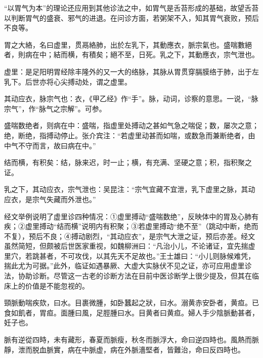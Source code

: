 \documentclass[12pt]{ctexbook}
\begin{document}
“以胃气为本”的理论还应用到其他诊法之中，如胃气是舌苔形成的基础，故望舌苔以判断胃气的盛衰、邪气的进退。在问诊方面，若粥架不入，知其胃气衰败，预后不良等。


\begin{yuanwen}
胃之大絡，名曰虚里，贯鬲絡肺，出於左乳下，其動應衣，脈宗氣也。盛喘數絕者，則病在中；結而横，有積矣；絕不至，日死。乳之下，其動應衣，宗气泄也。
\end{yuanwen}


\begin{jiaozhu}
	\item 虚里：是足阳明胃经除丰隆外的又一大的络脉，其脉从胃贯穿膈膜络于肺，出于左乳下。后世亦将心尖搏动处，谓之虚里。
	\item 其动应衣，脉宗气也：衣，《甲乙经》作“手”。脉，动词，诊察的意思。一说，“脉宗气”，作“脉气之宗解”。可参。
	\item 盛喘数绝者，则病在中：盛喘，指虚里处搏动之甚如气急之喘促；数，屡次之意；绝，断绝，指搏动停止。张介宾注：“若虚里动甚而如喘，或数急而兼断绝者，由中气不守而言，故曰病在中。”
	\item 结而横，有积矣：结，脉来迟，时一止；横，有充满、坚硬之意；积，指积聚之证。
	\item 乳之下，其动应衣，宗气泄也：吴昆注：“宗气宜藏不宜泄，乳下虚里之脉，其动应衣，是宗气失藏而外泄也。”
\end{jiaozhu}



经文举例说明了虚里诊四种情况：①虚里搏动“盛喘数绝”，反映体中的胃及心肺有疾；②虚里搏动“结而横”说明内有积聚；③若虚里搏动“绝不至”（跳动中断，绝而不复），预后不良；④搏动剧烈，“其动应衣”，是宗气大泄之证，预后亦差。经文虽然简短，但颇被后世医家重视，如魏柳洲曰：“凡治小儿，不论诸证，宜先揣虚里穴，若跳甚者，不可攻伐，以其先天不足故也。”王士雄曰：“小儿则脉候难凭，揣此尤为可据。”此外，临证如遇暴厥、大虚大实脉伏不见之证，亦可应用虚里诊法，协助诊断。尽管这一古老的诊断方法在目前中医诊断学上很少提及，但其在临床上的价值是不能忽视的。


\begin{yuanwen}
頸脈動喘疾欬，曰水。目裹微腫，如卧蠶起之狀，曰水。溺黄赤安卧者，黄疸。已食如飢者，胃疸。面腫曰風，足脛腫曰水。目黄者曰黄疸。婦人手少陰脈動甚者，妊子也。

脈有逆從四時，未有藏形，春夏而脈瘦，秋冬而脈浮大，命曰逆四時也。風熱而脈靜，泄而脱血脈實，病在中脈虚，病在外脈濇堅者，皆難治，命曰反四時也。
\end{yuanwen}
\end{document}
